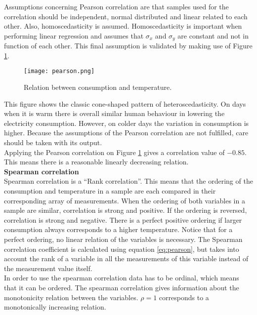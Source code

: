 Assumptions concerning Pearson correlation are that samples used for the correlation should be independent, normal distributed and linear related to each other. Also, homoscedasticity is assumed. Homoscedasticity is important when performing linear regression and assumes that $ \sigma_x $ and $ \sigma_y $ are constant and not in function of each other. This final assumption is validated by making use of Figure \ref{fig:pearson}.

\begin{figure}[h!]
	\centering
	\texttt{[image: pearson.png]}
	\caption{Relation between consumption and temperature.}
	\label{fig:pearson}
\end{figure}

This figure shows the classic cone-shaped pattern of heteroscedasticity. On days when it is warm there is overall similar human behaviour in lowering the electricity consumption. However, on colder days the variation in consumption is higher. Because the assumptions of the Pearson correlation are not fulfilled, care should be taken with its output.\\

Applying the Pearson correlation on Figure \ref{fig:pearson} gives a correlation value of $ -0.85 $. This means there is a reasonable linearly decreasing relation.\\


\textbf{Spearman correlation}\\
Spearman correlation is a ``Rank correlation''. This means that the ordering of the consumption and temperature in a sample are each compared in their corresponding array of measurements.  When the ordering of both variables in a sample are similar, correlation is strong and positive. If the ordering is reversed, correlation is strong and negative. There is a perfect positive ordering if larger consumption always corresponds to a higher temperature. Notice that for a perfect ordering, no linear relation of the variables is necessary. The Spearman correlation coefficient is calculated using equation \ref{eq:pearson}, but takes into account the rank of a variable in all the measurements of this variable instead of the measurement value itself.\\

In order to use the spearman correlation data has to be ordinal, which means that it can be ordered. The spearman correlation gives information about the monotonicity relation between the variables. $ \rho = 1 $ corresponds to a monotonically increasing relation.\\

